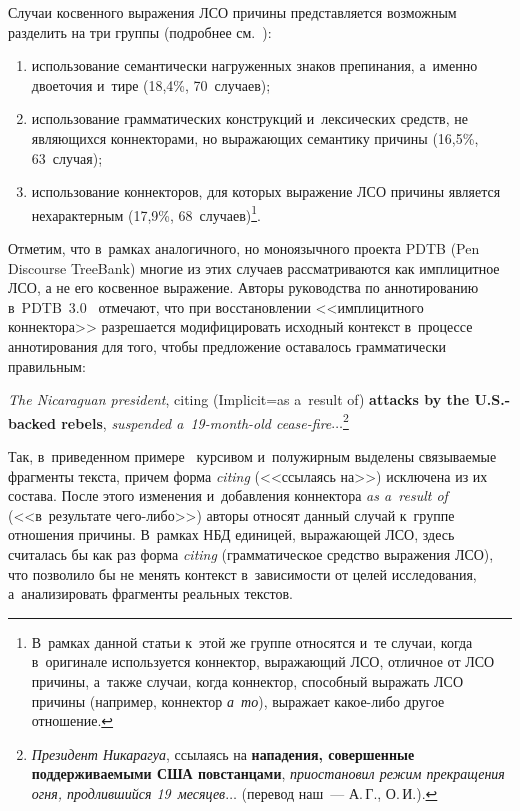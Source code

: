 \begin{multicols}{2}
   Случаи косвенного выражения ЛСО причины представляется возможным 
разделить на три группы (подробнее см.~\cite{16-in}):
   \begin{enumerate}[(1)]
\item использование семантически нагруженных знаков препинания, 
а~именно двоеточия и~тире (18,4\%, 70~случаев);
\item использование грамматических конструкций и~лексических средств, не 
являющихся коннекторами, но выражающих семантику причины (16,5\%, 
63~случая);
\item использование коннекторов, для которых выражение ЛСО причины 
является нехарактерным (17,9\%, 68~случаев)\footnote{В~рамках данной статьи 
к~этой же группе относятся и~те случаи, когда в~оригинале используется коннектор, выражающий 
ЛСО, отличное от ЛСО причины, а~также случаи, когда коннектор, способный выражать ЛСО 
причины (например, коннектор \textit{а~то}), выражает ка\-кое-ли\-бо другое отношение.}.
\end{enumerate}

   Отметим, что в~рамках аналогичного, но моноязычного проекта PDTB 
   (Pen Discourse TreeBank)
многие из этих случаев рассматриваются как имплицитное ЛСО, а не его 
косвенное выражение. Авторы руководства по аннотированию 
в~PDTB~3.0~\cite{10-in} отмечают, что при восстановлении 
<<имплицитного коннектора>> разрешается модифицировать исходный 
контекст в~процессе аннотирования для того, чтобы предложение оставалось 
грамматически правильным:
   
   \textit{The Nicaraguan president}, citing (Implicit\;=\;as a~result of) 
\textbf{attacks by the U.S.-backed rebels}, \textit{suspended a~19-month-old 
cease-fire}$\ldots$\footnote{\textit{Президент Никарагуа}, ссылаясь на \textbf{нападения, 
совершенные поддерживаемыми США повстанцами}, \textit{приостановил режим 
прекращения огня, продлившийся 19~месяцев}$\ldots$ (перевод наш~--- А.\,Г., О.\,И.).}
   
   Так, в~приведенном примере~\cite[с.~35]{10-in} курсивом и~полужирным 
выделены связываемые фрагменты текста, причем форма \textit{citing} 
(<<ссылаясь на>>) исключена из их состава. После этого изменения 
и~добавления коннектора \textit{as a~result of} (<<в~результате  
че\-го-ли\-бо>>) авторы относят данный случай к~группе отношения 
причины. В~рамках НБД единицей, выражающей ЛСО, здесь считалась бы 
как раз форма \textit{citing} (грамматическое средство выражения ЛСО), что 
позволило бы не менять контекст в~зависимости от целей исследования, 
а~анализировать фрагменты реальных текстов.
   

\end{multicols}
